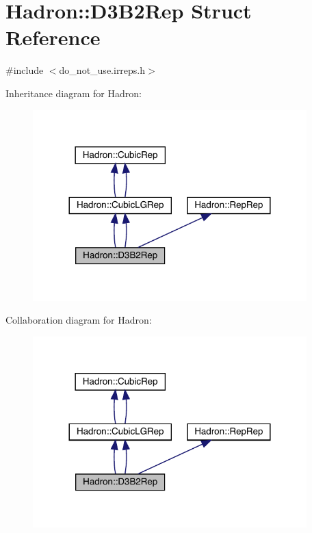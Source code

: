 \hypertarget{structHadron_1_1D3B2Rep}{}\section{Hadron\+:\+:D3\+B2\+Rep Struct Reference}
\label{structHadron_1_1D3B2Rep}


{\ttfamily \#include $<$do\+\_\+not\+\_\+use.\+irreps.\+h$>$}



Inheritance diagram for Hadron\+:\nopagebreak
\begin{figure}[H]
\begin{center}
\leavevmode
\includegraphics[width=300pt]{d2/d25/structHadron_1_1D3B2Rep__inherit__graph}
\end{center}
\end{figure}


Collaboration diagram for Hadron\+:\nopagebreak
\begin{figure}[H]
\begin{center}
\leavevmode
\includegraphics[width=300pt]{de/dec/structHadron_1_1D3B2Rep__coll__graph}
\end{center}
\end{figure}
